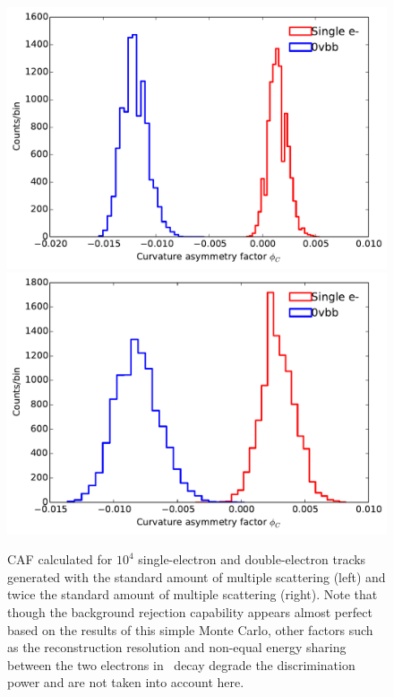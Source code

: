 \documentclass{JINST}
\begin{document}
\begin{figure}[!htb]
	\includegraphics[scale=0.45]{fig/scurv_diff_means_ms13pt6.pdf}
	\includegraphics[scale=0.45]{fig/scurv_diff_means_ms27pt2.pdf}
	\caption{\label{fig_assym_cf} CAF calculated for $10^4$ single-electron and double-electron tracks generated with the standard amount of multiple scattering (left) and twice the standard amount of multiple scattering (right).  Note that though the background rejection capability appears almost perfect based on the results of this simple Monte Carlo, other factors such as the reconstruction resolution and non-equal energy sharing between the two electrons in \bbonu\ decay degrade the discrimination power and are not taken into account here.}
\end{figure}
\end{document}

